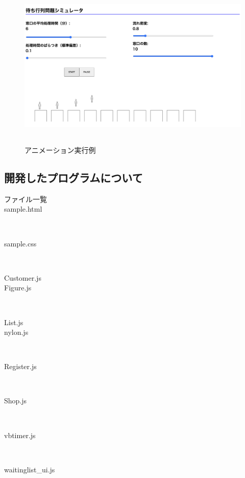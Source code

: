 \documentclass[12pt,a4j]{ltjsarticle}
\begin{document}
\begin{figure}[h]
\begin{center}
\includegraphics[height = 80mm ] {figures/lay_anime.pdf}
\caption{アニメーション実行例}
\label{fig:アニメ実行}
\end{center}
\end{figure}

\clearpage

\subsection{開発したプログラムについて}

\begin{description}
  \item[ファイル一覧]
  
  \item[sample.html]　  
  \item[sample.css]　
  \item[Customer.js]
  \item[Figure.js] 　
  \item[List.js]
  \item[nylon.js]　
  \item[Register.js]　
  \item[Shop.js]　
  \item[vbtimer.js]　
  \item[waitinglist\_ui.js]　
\end{description}

\clearpage
\end{document}
